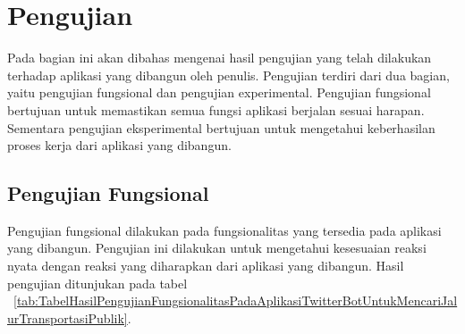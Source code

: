 \section{Pengujian}
Pada bagian ini akan dibahas mengenai hasil pengujian yang telah dilakukan terhadap aplikasi yang dibangun oleh penulis. Pengujian terdiri dari dua bagian, yaitu pengujian fungsional dan pengujian experimental. Pengujian fungsional bertujuan untuk memastikan semua fungsi aplikasi berjalan sesuai harapan. Sementara pengujian eksperimental bertujuan untuk mengetahui keberhasilan proses kerja dari aplikasi yang dibangun.

\subsection{Pengujian Fungsional}
Pengujian fungsional dilakukan pada fungsionalitas yang tersedia pada aplikasi yang dibangun. Pengujian ini dilakukan untuk mengetahui kesesuaian reaksi nyata dengan reaksi yang diharapkan dari aplikasi yang dibangun. Hasil pengujian ditunjukan pada tabel ~\ref{tab:TabelHasilPengujianFungsionalitasPadaAplikasiTwitterBotUntukMencariJalurTransportasiPublik}.

